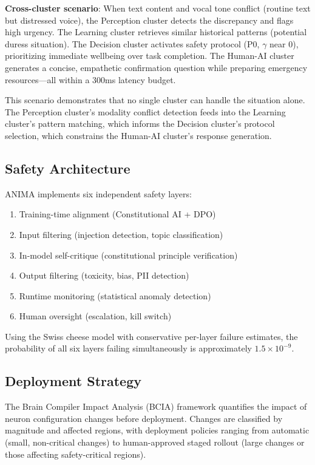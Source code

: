 \documentclass[11pt,a4paper]{article}
\begin{document}
\textbf{Cross-cluster scenario}: When text content and vocal tone conflict (routine text but distressed voice), the Perception cluster detects the discrepancy and flags high urgency. The Learning cluster retrieves similar historical patterns (potential duress situation). The Decision cluster activates safety protocol (P0, $\gamma$ near 0), prioritizing immediate wellbeing over task completion. The Human-AI cluster generates a concise, empathetic confirmation question while preparing emergency resources---all within a 300ms latency budget.

This scenario demonstrates that no single cluster can handle the situation alone. The Perception cluster's modality conflict detection feeds into the Learning cluster's pattern matching, which informs the Decision cluster's protocol selection, which constrains the Human-AI cluster's response generation.

\subsection{Safety Architecture}

ANIMA implements six independent safety layers:
\begin{enumerate}
  \item Training-time alignment (Constitutional AI + DPO)
  \item Input filtering (injection detection, topic classification)
  \item In-model self-critique (constitutional principle verification)
  \item Output filtering (toxicity, bias, PII detection)
  \item Runtime monitoring (statistical anomaly detection)
  \item Human oversight (escalation, kill switch)
\end{enumerate}

Using the Swiss cheese model with conservative per-layer failure estimates, the probability of all six layers failing simultaneously is approximately $1.5 \times 10^{-9}$.

\subsection{Deployment Strategy}

The Brain Compiler Impact Analysis (BCIA) framework quantifies the impact of neuron configuration changes before deployment. Changes are classified by magnitude and affected regions, with deployment policies ranging from automatic (small, non-critical changes) to human-approved staged rollout (large changes or those affecting safety-critical regions).
\end{document}
